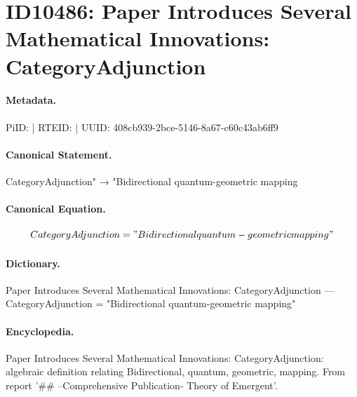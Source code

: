 \section*{ID10486: Paper Introduces Several Mathematical Innovations: CategoryAdjunction}
\paragraph{Metadata.}
PiID:  | RTEID:  | UUID: 408cb939-2bce-5146-8a67-c60c43ab6ff9

\paragraph{Canonical Statement.}
CategoryAdjunction" → "Bidirectional quantum-geometric mapping

\paragraph{Canonical Equation.}
\[
CategoryAdjunction = "Bidirectional quantum-geometric mapping"
\]

\paragraph{Dictionary.}
Paper Introduces Several Mathematical Innovations: CategoryAdjunction — CategoryAdjunction = "Bidirectional quantum-geometric mapping"

\paragraph{Encyclopedia.}
Paper Introduces Several Mathematical Innovations: CategoryAdjunction: algebraic definition relating Bidirectional, quantum, geometric, mapping. From report '\#\# --Comprehensive Publication- Theory of Emergent'.
